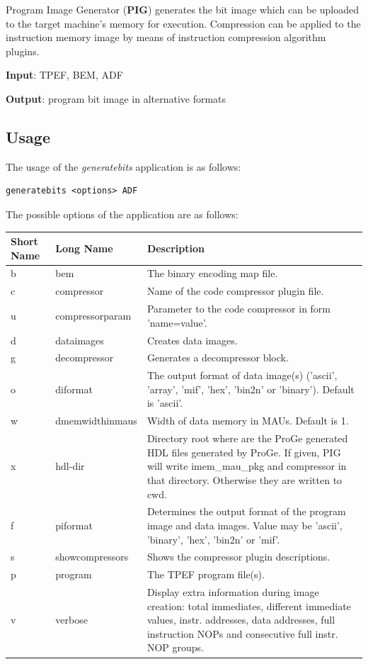 \documentclass[a4paper,twoside]{tceusermanual}
\begin{document}
Program Image Generator (\textbf{PIG}) generates the bit image which can be
uploaded to the target machine's memory for execution. Compression can be
applied to the instruction memory image by means of instruction compression
algorithm plugins.

\textbf{Input}: TPEF, BEM, ADF

\textbf{Output}: program bit image in alternative formats

\subsection{Usage}

The usage of the \emph{generatebits} application is as follows:

\begin{verbatim}
generatebits <options> ADF
\end{verbatim}

The possible options of the application are as follows:\\

\begin{tabular}{p{}p{}
                p{}}
\textbf{Short Name} &\textbf{Long Name} &\textbf{Description} \\
\hline
b & bem         & The binary encoding map file.\\
c & compressor  & Name of the code compressor plugin file.\\
u & compressorparam & Parameter to the code compressor in form 'name=value'. \\
d & dataimages  & Creates data images.\\
g & decompressor & Generates a decompressor block. \\
o & diformat & The output format of data image(s) ('ascii', 'array', 'mif', 
'hex', 'bin2n' or 'binary'). Default is 'ascii'. \\
w & dmemwidthinmaus & Width of data memory in MAUs. Default is 1. \\
x & hdl-dir & Directory root where are the ProGe generated HDL files
generated by ProGe. If given, PIG will write imem\_mau\_pkg and compressor
in that directory. Otherwise they are written to cwd.\\
f & piformat & Determines the output format of the program image and data
images. Value may be 'ascii', 'binary', 'hex', 'bin2n' or 'mif'.\\
s & showcompressors & Shows the compressor plugin descriptions. \\
p & program & The TPEF program file(s).\\
v & verbose & Display extra information during image creation: total 
immediates, different immediate values, instr. addresses, data addresses,
full instruction NOPs and consecutive full instr. NOP groups.\\
\end{tabular}\\
\end{document}
